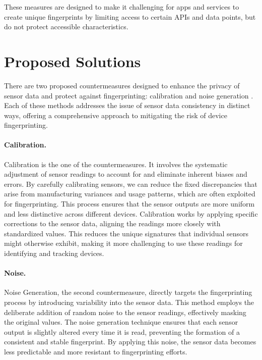 \documentclass[11pt,
  oneside,openany,    %
]{scrreprt}
\begin{document}
These measures are designed to make it challenging for apps and services to create unique fingerprints by limiting access to certain APIs and data points, but do not protect accessible characteristics.

\section{Proposed Solutions}
\label{sec:proposed}
There are two proposed countermeasures designed to enhance the privacy of sensor data and protect against fingerprinting: calibration and noise generation \cite{DBLP:conf/ndss/DasBC16}. 
Each of these methods addresses the issue of sensor data consistency in distinct ways, offering a comprehensive approach to mitigating the risk of device fingerprinting.

\paragraph{Calibration.}
\label{par:calibration}
Calibration is the one of the countermeasures.
It involves the systematic adjustment of sensor readings to account for and eliminate inherent biases and errors. 
By carefully calibrating sensors, we can reduce the fixed discrepancies that arise from manufacturing variances and usage patterns, which are often exploited for fingerprinting. 
This process ensures that the sensor outputs are more uniform and less distinctive across different devices. 
Calibration works by applying specific corrections to the sensor data, aligning the readings more closely with standardized values. 
This reduces the unique signatures that individual sensors might otherwise exhibit, making it more challenging to use these readings for identifying and tracking devices.

\paragraph{Noise.}
\label{par:noise}
Noise Generation, the second countermeasure, directly targets the fingerprinting process by introducing variability into the sensor data. 
This method employs the deliberate addition of random noise to the sensor readings, effectively masking the original values. 
The noise generation technique ensures that each sensor output is slightly altered every time it is read, preventing the formation of a consistent and stable fingerprint. 
By applying this noise, the sensor data becomes less predictable and more resistant to fingerprinting efforts.
\end{document}
